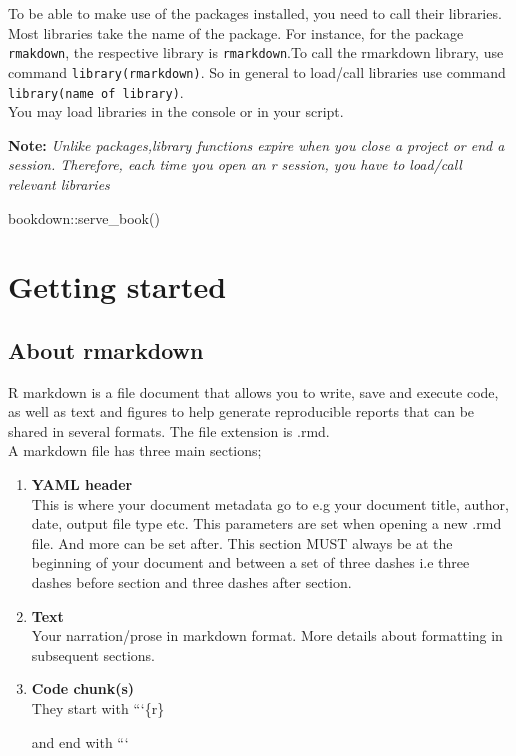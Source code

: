 \documentclass[
]{book}
\newenvironment{Shaded}{\begin{snugshade}}{\end{snugshade}}
\newcommand{\FunctionTok}[1]{\textcolor[rgb]{0.00,0.00,0.00}{#1}}
\newcommand{\NormalTok}[1]{#1}
\newcommand{\SpecialCharTok}[1]{\textcolor[rgb]{0.00,0.00,0.00}{#1}}
\begin{document}
To be able to make use of the packages installed, you need to call their libraries. Most libraries take the name of the package. For instance, for the package \texttt{rmakdown}, the respective library is \texttt{rmarkdown}.To call the rmarkdown library, use command \texttt{library(rmarkdown)}.
So in general to load/call libraries use command \texttt{library(name\ of\ library)}.\\
You may load libraries in the console or in your script.

\textbf{Note:} \emph{Unlike packages,library functions expire when you close a project or end a session. Therefore, each time you open an r session, you have to load/call relevant libraries}

\begin{Shaded}
\begin{Highlighting}[]
\NormalTok{bookdown}\SpecialCharTok{::}\FunctionTok{serve\_book}\NormalTok{()}
\end{Highlighting}
\end{Shaded}

\hypertarget{getting-started}{%
\chapter{Getting started}\label{getting-started}}

\hypertarget{about-rmarkdown}{%
\section{About rmarkdown}\label{about-rmarkdown}}

R markdown is a file document that allows you to write, save and execute code, as well as text and figures to help generate reproducible reports that can be shared in several formats.
The file extension is .rmd.\\
A markdown file has three main sections;

\begin{enumerate}
\def\labelenumi{\arabic{enumi}.}
\item
  \textbf{YAML header}\\
  This is where your document metadata go to e.g your document title, author, date, output file type etc.
  This parameters are set when opening a new .rmd file. And more can be set after.
  This section MUST always be at the beginning of your document and between a set of three dashes i.e three dashes before section and three dashes after section.
\item
  \textbf{Text}\\
  Your narration/prose in markdown format. More details about formatting in subsequent sections.
\item
  \textbf{Code chunk(s)}\\
  They start with ```\{r\}

  and end with ```
\end{enumerate}
\end{document}

